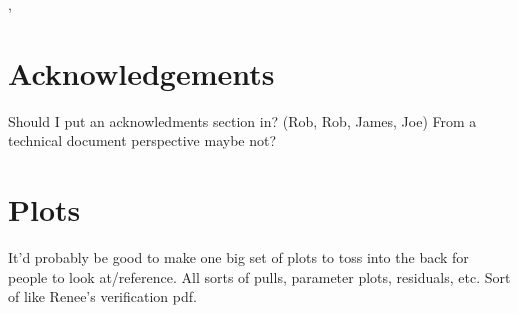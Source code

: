 \documentclass{article}
\begin{document}
\cite{jacob}, \cite{energyloss}

\printbibliography


\section{Acknowledgements}

Should I put an acknowledments section in? (Rob, Rob, James, Joe)
From a technical document perspective maybe not?

\section{Plots}

It'd probably be good to make one big set of plots to toss into the back for people to look at/reference. All sorts of pulls, parameter plots, residuals, etc. Sort of like Renee's verification pdf.
\end{document}
